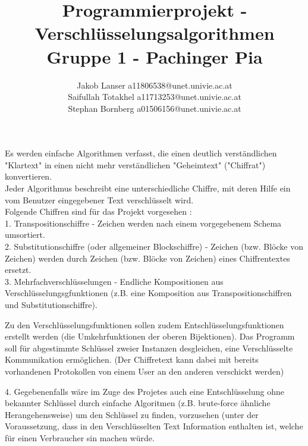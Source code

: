 \documentclass{article}
\title{Programmierprojekt - Verschlüsselungsalgorithmen\\Gruppe 1 -  Pachinger Pia}
\author{Jakob Lanser a11806538@unet.univie.ac.at\\Saifullah Totakhel a11713253@unet.univie.ac.at\\Stephan Bornberg a01506156@unet.univie.ac.at}
\begin{document}
\maketitle

Es werden einfache Algorithmen verfasst, die einen deutlich verständlichen "Klartext" in einen nicht mehr verständlichen "Geheimtext" ("Chiffrat") konvertieren.\\
Jeder Algorithmus beschreibt eine unterschiedliche Chiffre, mit deren Hilfe ein vom Benutzer eingegebener Text verschlüsselt wird.\\
Folgende Chiffren sind für das Projekt vorgesehen :\\
1. Transpositionschiffre - Zeichen werden nach einem vorgegebenem Schema umsortiert.\\
2. Substitutionschiffre (oder allgemeiner Blockschiffre) - Zeichen (bzw. Blöcke von Zeichen) werden durch Zeichen (bzw. Blöcke von Zeichen) eines Chiffrentextes ersetzt.\\
3. Mehrfachverschlüsselungen - Endliche Kompositionen aus Verschlüsselungsgfunktionen (z.B. eine Komposition aus Transpositionschiffren und Substitutionschiffre).

Zu den Verschlüsselungsfunktionen sollen zudem Entschlüsselungsfunktionen erstellt werden (die Umkehrfunktionen der oberen Bijektionen). Das Programm soll für abgestimmte Schlüssel zweier Instanzen desgleichen, eine Verschlüsselte Kommunikation ermöglichen. (Der Chiffretext kann dabei mit bereits vorhandenen Protokollen von einem User an den anderen verschickt werden)

4. Gegebenenfalls wäre im Zuge des Projetes auch eine Entschlüsselung ohne bekannter Schlüssel durch einfache Algoritmen (z.B. brute-force ähnliche Herangehensweise) um den Schlüssel zu finden, vorzusehen (unter der Voraussetzung, dass in den Verschlüsselten Text Information enthalten ist, welche für einen Verbraucher sin machen würde. 
\end{document}
